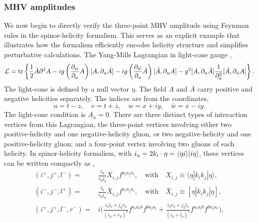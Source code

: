\documentclass[a4paper,11pt]{article}
\begin{document}
\subsubsection{MHV amplitudes}
We now begin to directly verify the three-point MHV amplitude using Feynman rules in the spinor-helicity formalism.
This serves as an explicit example that illustrates how the formalism efficiently encodes helicity structure and simplifies perturbative calculations.
The Yang-Mills Lagrangian in light-cone gauge \cite{Chalmers:1998jb},
\begin{equation}
    \mathcal{L}=\tr\left\{\frac{1}{2}\bar{A}\partial^2A-ig\left(\frac{\partial_w}{\partial_u}A\right)[A,\partial_u\bar{A}]-ig\left(\frac{\partial_{\bar{w}}}{\partial_u}\bar{A}\right)[\bar{A},\partial_uA]-g^2[A,\partial_u\bar{A}]\frac{1}{\partial_u^2}[\bar{A},\partial_uA]\right\}.
\end{equation}
The light-cone is defined by a null vector $\eta$. The field $A$ and $\bar{A}$ carry positive and negative helicities separately. The indices are from the coordinates,
\begin{equation}
    u=t-z,\quad v=t+z,\quad w=x+iy,\quad \bar{w}=x-iy.
\end{equation}
The light-cone condition is $A_u=0$. There are three distinct types of interaction vertices from this Lagrangian, 
the three-point vertices involving either two positive-helicity and one negative-helicity gluon, or two negative-helicity and one positive-helicity gluon; 
and a four-point vertex involving two gluons of each helicity.
In spinor-helicity formalism, with $i_\eta=2k_i\cdot \eta=\langle \eta i \rangle[i \eta]$, these vertices can be written compactly as \cite{Boels:2013bi},
\begin{equation}
    \begin{split}
    (i^{+},j^{+},l^{-})=&\frac{l_{\eta}}{i_{\eta}j_{\eta}}X_{i,j}f^{a_{i}a_{j}a_{l}},\quad\mathrm{with}\quad X_{i,j}\equiv\langle\eta|k_{i}k_{j}|\eta\rangle,\\
    (i^{-},j^{-},l^{+})=&\frac{l_{\eta}}{i_{\eta}j_{\eta}}\overline{X}_{i,j}f^{a_{i}a_{j}a_{i}},\quad\mathrm{with}\quad\overline{X}_{i,j}\equiv[\eta|k_{i}k_{j}|\eta],\\
    (i^{+},j^{+},l^{-},r^{-})=&i\bigg(\frac{i_{\eta}l_{\eta}+j_{\eta}r_{\eta}}{(i_{\eta}+r_{\eta})^{2}}f^{a_{i}a_{r}b}f^{ba_{j}a_{l}}+\frac{i_{\eta}r_{\eta}+j_{\eta}l_{\eta}}{(i_{\eta}+l_{\eta})^{2}}f^{a_{i}a_{l}b}f^{ba_{j}a_{r}}\bigg),
    \end{split}
\end{equation}
\end{document}
